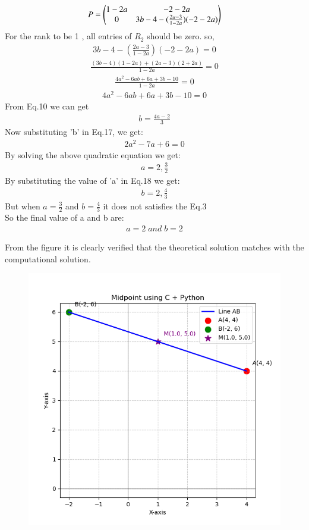\documentclass[journal]{IEEEtran}
\theoremstyle{remark}
\begin{document}
\begin{align}
    P=\begin{pmatrix}1-2a&-2-2a\\0&3b-4-(\frac{2a-3}{1-2a})(-2-2a)\end{pmatrix}
\end{align}
For the rank to be 1 , all entries of $R_2$ should be zero. so,
\begin{align}
3b-4-(\frac{2a-3}{1-2a})(-2-2a)=0
\end{align}
\begin{align}
    \frac{(3b-4)(1-2a)+(2a-3)(2+2a)}{1-2a}=0
\end{align}
\begin{align}
    \frac{4a^2-6ab+6a+3b-10}{1-2a}=0
\end{align}
\begin{align}
    4a^2-6ab+6a+3b-10=0
\end{align}
From Eq.10 we can get
\begin{align}
    b=\frac{4a-2}{3}
\end{align}
Now substituting 'b' in Eq.17, we get:
\begin{align}
2a^2-7a+6=0
\end{align}
By solving the above quadratic equation we get:
\begin{align}
a=2,\frac{3}{2}
\end{align}
By substituting the value of 'a' in Eq.18 we get:
\begin{align}
b=2,\frac{4}{3}
\end{align}
But when $a=\frac{3}{2}$ and $b=\frac{4}{3}$ it does not satisfies the Eq.3\\
So the final value of a and b are:
\begin{align}
    a=2\;and\;b=2
\end{align}


From the figure it is clearly verified that the theoretical solution matches with the computational solution.\\
\begin{figure}[h]
    \centering
    \includegraphics[height=0.5\textheight, keepaspectratio]{figs/figure1.png}
    \label{figure_1}
\end{figure}
\end{document}

